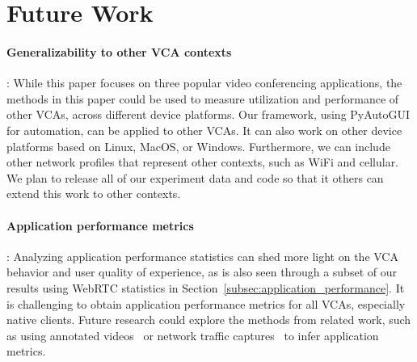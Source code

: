 \section{Future Work}
\label{sec:discussion}

\paragraph{Generalizability to other VCA contexts}: While this paper focuses on
three popular video conferencing applications, the methods in this paper could
be used to measure utilization and performance of other VCAs, across different
device platforms. Our framework, using PyAutoGUI for automation, can be
applied to other VCAs. It can also work on other device platforms based on Linux,
MacOS, or Windows. 
Furthermore, we can include other network profiles that represent
other contexts, such as WiFi and cellular. We plan to release all of our
experiment data and code so that it others can extend this work 
to other contexts.

\paragraph{Application performance metrics}: Analyzing application performance
statistics can shed more light on the VCA behavior and user quality of
experience, as is also seen through a subset of our results using WebRTC
statistics in Section~\ref{subsec:application_performance}. It is challenging
to obtain application performance metrics for all VCAs, especially native
clients. Future research could explore the methods from related work, such as
using annotated videos~\cite{xu2012video} or network traffic
captures~\cite{dasari2018scalable} to infer application metrics.

